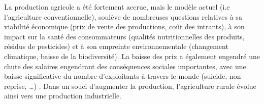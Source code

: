 \documentclass[../thesis.tex]{subfiles}
\begin{document}
    La production agricole a été fortement accrue, mais le modèle actuel (i.e l'agriculture conventionnelle), soulève de nombreuses questions relatives à sa viabilité économique (prix de vente des productions, coût des intrants), à son impact sur la santé des consommateurs (qualités nutritionnelles des produits, résidus de pesticides) et à son empreinte environnementale \cite{loiret:tel-01306180} (changement climatique, baisse de la biodiversité). La baisse des prix a également engendré une chute des salaires engendrant des conséquences sociales importantes, avec une baisse significative du nombre d'exploitants à travers le monde (suicide, non-reprise, \dots) \cite{chaumeil1939travaux, shiva2006seeds, carles2007volem, nagaraj2008farmers, Suicide2021, utyasheva2021suicide}. Dans un souci d'augmenter la production, l'agriculture rurale évolue ainsi vers une production industrielle.
    
    
    
\end{document}
